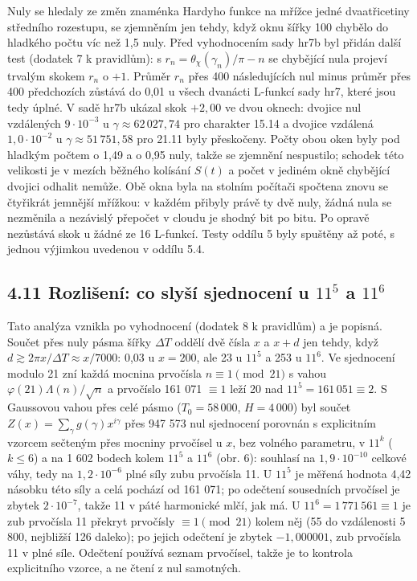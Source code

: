 \documentclass[
  10pt,
]{article}
\begin{document}
Nuly se hledaly ze změn znaménka Hardyho funkce na mřížce jedné
dvaatřicetiny středního rozestupu, se zjemněním jen tehdy, když oknu
šířky 100 chybělo do hladkého počtu víc než 1,5 nuly. Před vyhodnocením
sady hr7b byl přidán další test (dodatek 7 k pravidlům): s
\(r_n = \theta_\chi(\gamma_n)/\pi - n\) se chybějící nula projeví
trvalým skokem \(r_n\) o \(+1\). Průměr \(r_n\) přes 400 následujících
nul minus průměr přes 400 předchozích zůstává do 0,01 u všech dvanácti
L-funkcí sady hr7, které jsou tedy úplné. V sadě hr7b ukázal skok
\(+2{,}00\) ve dvou oknech: dvojice nul vzdálených \(9\cdot10^{-3}\) u
\(\gamma \approx 62\,027{,}74\) pro charakter 15.14 a dvojice vzdálená
\(1{,}0\cdot10^{-2}\) u \(\gamma \approx 51\,751{,}58\) pro 21.11 byly
přeskočeny. Počty obou oken byly pod hladkým počtem o 1,49 a o 0,95
nuly, takže se zjemnění nespustilo; schodek této velikosti je v mezích
běžného kolísání \(S(t)\) a počet v jediném okně chybějící dvojici
odhalit nemůže. Obě okna byla na stolním počítači spočtena znovu se
čtyřikrát jemnější mřížkou: v každém přibyly právě ty dvě nuly, žádná
nula se nezměnila a nezávislý přepočet v cloudu je shodný bit po bitu.
Po opravě nezůstává skok u žádné ze 16 L-funkcí. Testy oddílu 5 byly
spuštěny až poté, s jednou výjimkou uvedenou v oddílu 5.4.

\hypertarget{rozliux161enuxed-co-slyux161uxed-sjednocenuxed-u-115-a-116}{%
\subsection{\texorpdfstring{4.11 Rozlišení: co slyší sjednocení u
\(11^5\) a
\(11^6\)}{4.11 Rozlišení: co slyší sjednocení u 11\^{}5 a 11\^{}6}}\label{rozliux161enuxed-co-slyux161uxed-sjednocenuxed-u-115-a-116}}

Tato analýza vznikla po vyhodnocení (dodatek 8 k pravidlům) a je
popisná. Součet přes nuly pásma šířky \(\Delta T\) oddělí dvě čísla
\(x\) a \(x + d\) jen tehdy, když
\(d \gtrsim 2\pi x/\Delta T \approx x/7000\): 0,03 u \(x = 200\), ale 23
u \(11^5\) a 253 u \(11^6\). Ve sjednocení modulo 21 zní každá mocnina
prvočísla \(n \equiv 1 \pmod{21}\) s vahou
\(\varphi(21)\Lambda(n)/\sqrt n\) a prvočíslo 161 071 \(\equiv 1\) leží
20 nad \(11^5 = 161\,051 \equiv 2\). S Gaussovou vahou přes celé pásmo
(\(T_0 = 58\,000\), \(H = 4\,000\)) byl součet
\(Z(x) = \sum_\gamma g(\gamma)x^{i\gamma}\) přes 947 573 nul sjednocení
porovnán s explicitním vzorcem sečteným přes mocniny prvočísel u \(x\),
bez volného parametru, v \(11^k\) (\(k \le 6\)) a na 1 602 bodech kolem
\(11^5\) a \(11^6\) (obr. 6): souhlasí na \(1{,}9\cdot10^{-10}\) celkové
váhy, tedy na \(1{,}2\cdot10^{-6}\) plné síly zubu prvočísla 11. U
\(11^5\) je měřená hodnota 4,42 násobku této síly a celá pochází od 161
071; po odečtení sousedních prvočísel je zbytek \(2\cdot10^{-7}\), takže
11 v páté harmonické mlčí, jak má. U \(11^6 = 1\,771\,561 \equiv 1\) je
zub prvočísla 11 překryt prvočísly \(\equiv 1 \pmod{21}\) kolem něj (55
do vzdálenosti 5 800, nejbližší 126 daleko); po jejich odečtení je
zbytek \(-1{,}000001\), zub prvočísla 11 v plné síle. Odečtení používá
seznam prvočísel, takže je to kontrola explicitního vzorce, a ne čtení z
nul samotných.
\end{document}
